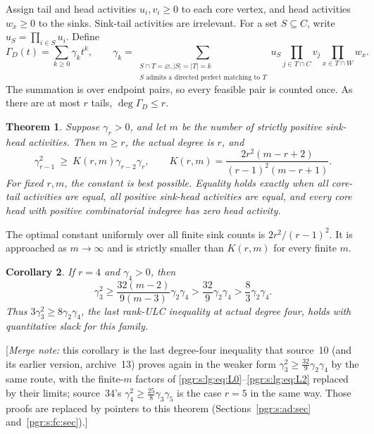 \documentclass[11pt]{article}
\numberwithin{equation}{section}
\newtheorem{theorem}{Theorem}[section]\newtheorem{lemma}[theorem]{Lemma}\newtheorem{proposition}[theorem]{Proposition}\newtheorem{corollary}[theorem]{Corollary}
\theoremstyle{definition}\newtheorem{definition}[theorem]{Definition}\newtheorem{remark}[theorem]{Remark}
\newcommand{\Ga}{\Gamma}                   %
\newcommand{\mnote}[1]{[\textit{Merge note:} #1]}
\begin{document}
Assign tail and head activities $u_i,v_i\ge0$ to each core vertex, and head activities $w_x\ge0$ to the sinks. Sink-tail activities are irrelevant. For a set $S\subseteq C$, write $u_S=\prod_{i\in S}u_i$. Define
\[
 \Ga_D(t)=\sum_{k\ge0}\gamma_k t^k,\qquad
 \gamma_k=\sum_{\substack{S\cap T=\varnothing, |S|=|T|=k\\
                         S\text{ admits a directed perfect matching to }T}}
 u_S\prod_{j\in T\cap C}v_j\prod_{x\in T\cap W}w_x.
\]
The summation is over endpoint pairs, so every feasible pair is counted once. As there are at most $r$ tails, $\deg\Ga_D\le r$.

\begin{theorem}\label{pgr:s:lg:thm:sharp}
Suppose $\gamma_r>0$, and let $m$ be the number of strictly positive sink-head activities. Then $m\ge r$, the actual degree is $r$, and
\begin{equation}\label{pgr:s:lg:eq:sharp}
 \gamma_{r-1}^2\ \ge\ K(r,m)\gamma_{r-2}\gamma_r,
 \qquad K(r,m)=\frac{2r^2(m-r+2)}{(r-1)^2(m-r+1)}.
\end{equation}
For fixed $r,m$, the constant is best possible. Equality holds exactly when all core-tail activities are equal, all positive sink-head activities are equal, and every core head with positive combinatorial indegree has zero head activity.
\end{theorem}

The optimal constant uniformly over all finite sink counts is $2r^2/(r-1)^2$. It is approached as $m\to\infty$ and is strictly smaller than $K(r,m)$ for every finite $m$.

\begin{corollary}\label{pgr:s:lg:cor:four}
If $r=4$ and $\gamma_4>0$, then
\[
 \gamma_3^2\ge \frac{32(m-2)}{9(m-3)}\gamma_2\gamma_4
              >\frac{32}{9}\gamma_2\gamma_4
              >\frac83\gamma_2\gamma_4.
\]
Thus $3\gamma_3^2\ge8\gamma_2\gamma_4$, the last rank-ULC inequality at actual degree four, holds with quantitative slack for this family.
\end{corollary}


\mnote{this corollary is the last degree-four inequality that source~10
(and its earlier version, archive~13) proves again in the weaker form
$\gamma_3^2\ge\frac{32}{9}\gamma_2\gamma_4$ by the same route, with the
finite-$m$ factors of \eqref{pgr:s:lg:eq:L0}--\eqref{pgr:s:lg:eq:L2}
replaced by their limits; source~34's
$\gamma_4^2\ge\frac{25}{8}\gamma_3\gamma_5$ is the case $r=5$ in the same
way. Those proofs are replaced by pointers to this theorem
(Sections~\ref{pgr:s:ad:sec} and~\ref{pgr:s:fc:sec}).}
\end{document}
